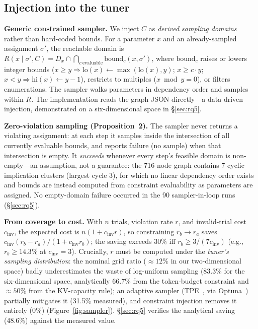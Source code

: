 \documentclass[journal]{IEEEtran}
\begin{document}
\subsection{Injection into the tuner}
\label{sec:inject}

\textbf{Generic constrained sampler.} We inject $C$ as \emph{derived sampling domains} rather than hard-coded bounds. For a parameter $x$ and an already-sampled assignment $\sigma'$, the reachable domain is $R(x \mid \sigma', C) = D_x \cap \bigcap_{c\ \text{evaluable}} \text{bound}_c(x, \sigma')$, where $\text{bound}_c$ raises or lowers integer bounds ($x \geq y \Rightarrow \text{lo}(x) \leftarrow \max(\text{lo}(x), y)$; $x \geq c\cdot y$; $x < y \Rightarrow \text{hi}(x) \leftarrow y-1$), restricts to multiples ($x \bmod y = 0$), or filters enumerations. The sampler walks parameters in dependency order and samples within $R$. The implementation reads the graph JSON directly---a data-driven injection, demonstrated on a six-dimensional space in \S\ref{sec:rq5}.

\textbf{Zero-violation sampling (Proposition~2).} The sampler never returns a violating assignment: at each step it samples inside the intersection of all currently evaluable bounds, and reports failure (no sample) when that intersection is empty. It \emph{succeeds} whenever every step's feasible domain is non-empty---an assumption, not a guarantee: the 716-node graph contains 7 cyclic implication clusters (largest cycle 3), for which no linear dependency order exists and bounds are instead computed from constraint evaluability as parameters are assigned. No empty-domain failure occurred in the 90 sampler-in-loop runs (\S\ref{sec:rq5}).

\textbf{From coverage to cost.} With $n$ trials, violation rate $r$, and invalid-trial cost $c_{\text{inv}}$, the expected cost is $n(1 + c_{\text{inv}} r)$, so constraining $r_b \rightarrow r_a$ saves $c_{\text{inv}}(r_b - r_a)/(1 + c_{\text{inv}} r_b)$; the saving exceeds 30\% iff $r_b \geq 3/(7 c_{\text{inv}})$ (e.g., $r_b \geq 14.3\%$ at $c_{\text{inv}} = 3$). Crucially, $r$ must be computed under the \emph{tuner's sampling distribution}: the nominal grid ratio (${\approx}12\%$ in our two-dimensional space) badly underestimates the waste of log-uniform sampling (83.3\% for the six-dimensional space, analytically 66.7\% from the token-budget constraint and ${\approx}50\%$ from the KV-capacity rule); an adaptive sampler (TPE~\cite{tpe}, via Optuna~\cite{ref7}) partially mitigates it (31.5\% measured), and constraint injection removes it entirely (0\%) (Figure~\ref{fig:sampler}). \S\ref{sec:rq5} verifies the analytical saving (48.6\%) against the measured value.
\end{document}
